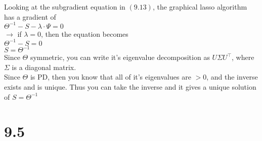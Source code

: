 \documentclass[11pt]{article}
\begin{document}
Looking at the subgradient equation in $(9.13)$, the graphical lasso algorithm has a gradient of\\
$\Theta^{-1} - S - \lambda \cdot \Psi = 0$\\
$\rightarrow$ if $\lambda = 0$, then the equation becomes\\
$\Theta^{-1} - S = 0$\\
$S = \Theta^{-1}$\\
Since $\Theta$ symmetric, you can write it's eigenvalue decomposition as $U \Sigma U^\top$, where $\Sigma$ is a diagonal matrix.\\
Since $\Theta$ is PD, then you know that all of it's eigenvalues are $> 0$, and the inverse exists and is unique. Thus you can take the inverse and it gives a unique solution of $S = \Theta^{-1}$

\newpage

\section*{9.5}
\end{document}
